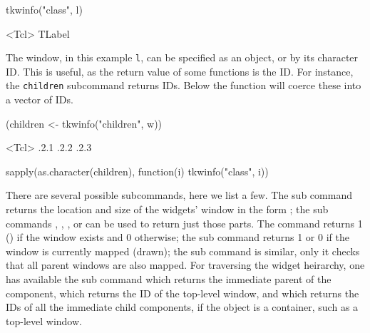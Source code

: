 \begin{Schunk}
\begin{Sinput}
 tkwinfo("class", l)
\end{Sinput}
\begin{Soutput}
<Tcl> TLabel 
\end{Soutput}
\end{Schunk}
%

The window, in this example \texttt{l}, can be specified as an \R\/
object, or by its character ID. This is useful, as the return value of
some functions is the ID. For instance, the \texttt{children}
subcommand returns IDs. Below the  function will
coerce these into a vector of IDs.

\begin{Schunk}
\begin{Sinput}
 (children <- tkwinfo("children", w))
\end{Sinput}
\begin{Soutput}
<Tcl> .2.1 .2.2 .2.3 
\end{Soutput}
\begin{Sinput}
 sapply(as.character(children), function(i) tkwinfo("class", i))
\end{Sinput}
\end{Schunk}

There are several possible subcommands, here we list a few. The
 sub command returns the location and
size of the widgets' window in the form ;
the sub commands ,
, , or
 can be used to return just those parts. The
 command returns 1 () if the
window exists and 0 otherwise; the  sub
command returns 1 or 0 if the window is currently mapped (drawn); the
 sub command is similar, only it checks
that all parent windows are also mapped.  For traversing the widget
heirarchy, one has available the  sub
command which returns the immediate parent of the component,
 which returns the ID of the top-level
window, and  which returns the IDs of
all the immediate child components, if the object is a container, such
as a top-level window.


